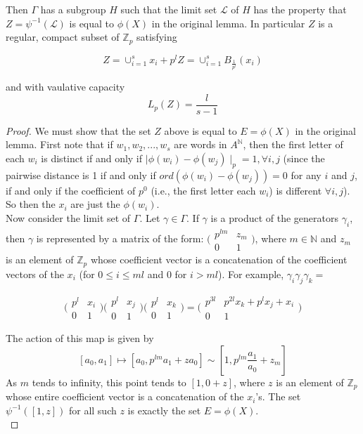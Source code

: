 Then $\Gamma$ has a subgroup $H$ such that the limit set $\mathcal{L}$ of $H$ has the property that $ Z = \psi^{-1}(\mathcal{L})$ is equal to $\phi(X)$ in the original lemma. In particular $Z$ is a regular, compact subset of $\mathbb{Z}_p$ satisfying

$$ Z= \cup_{i=1}^s x_i + p^lZ =\cup_{i=1}^s B_{\frac{1}{p^l}}(x_i)$$

and with vaulative capacity \[L_p(Z) = \frac{l}{s-1}\]


\begin{proof}
	We must show that the set $Z$ above is equal to $E=\phi(X)$ in the original lemma. First note that if $w_1, w_2,...,w_s$ are words in $A^\mathbb{N}$, then the first letter of each $w_i$ is distinct if and only if $\mid \phi(w_i) - \phi(w_j) \mid_p = 1, \forall i,j$  (since the pairwise distance is 1 if and only if  $ord(\phi(w_i) - \phi(w_j)) = 0$ for any $i$ and $j$, if and only if the coefficient of $p^0$ (i.e., the first letter each $w_i$) is different $\forall i,j$). So then the $x_i$ are just the $\phi(w_i)$.  \\
	
Now consider the limit set of $\Gamma$. Let $\gamma \in \Gamma$.
If $\gamma$ is a product of the generators $\gamma_i$, then $\gamma$ is represented by a matrix of the form:  $\bigl( \begin{smallmatrix}p^{lm} & z_m\\ 0 & 1 \end{smallmatrix}\bigr)$,  where $m \in \mathbb{N}$ and $z_m$ is an element of $\mathbb{Z}_p$ whose coefficient vector is a concatenation of the coefficient vectors of the $x_i$ (for $0 \leq i \leq ml$ and $0$ for $i > ml$). For example, $\gamma_i \gamma_j \gamma_k =$
 
\[\bigl( \begin{smallmatrix}p^{l} & x_i\\ 0 & 1 \end{smallmatrix}\bigr) \bigl( \begin{smallmatrix}p^{l} & x_j\\ 0 & 1 \end{smallmatrix}\bigr) \bigl( \begin{smallmatrix}p^{l} & x_k\\ 0 & 1 \end{smallmatrix}\bigr) = 
\bigl( \begin{smallmatrix}p^{3l} & p^{2l}x_k + p^lx_j +x_i\\ 0 & 1 \end{smallmatrix}\bigr)\]
\item The action of this map is given by \[[a_0,a_1] \mapsto [a_0, p^{lm}a_1 + za_0] \sim [1, p^{lm}\frac{a_1}{a_0} + z_m]\]
As $m$ tends to infinity, this point tends to $ [1, 0 + z]$, where $z$ is an element of $\mathbb{Z}_p$ whose entire coefficient vector is a concatenation of the $x_i$'s. The set $\psi^{-1}([1,z])$ for all such $z$ is exactly the set $E=\phi(X)$.\\


\end{proof}
